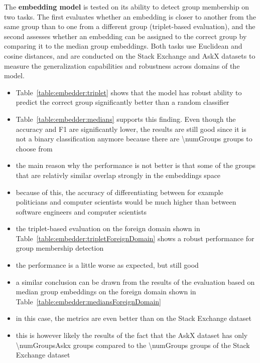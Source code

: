 The \textbf{embedding model} is tested on its ability to detect group membership on two tasks. The first evaluates whether an embedding is closer to another from the same group than to one from a different group (triplet-based evaluation), and the second assesses whether an embedding can be assigned to the correct group by comparing it to the median group embeddings. Both tasks use Euclidean and cosine distances, and are conducted on the Stack Exchange and AskX datasets to measure the generalization capabilities and robustness across domains of the model.

\begin{itemize}
  \item Table~\ref{table:embedder:triplet} shows that the model has robust ability to predict the correct group significantly better than a random classifier
  \item Table~\ref{table:embedder:medians} supports this finding. Even though the accuracy and F1 are significantly lower, the results are still good since it is not a binary classification anymore because there are \num{\numGroups} groups to choose from
  \item the main reason why the performance is not better is that some of the groups that are relativly similar overlap strongly in the embeddings space
  \item because of this, the accuracy of differentiating between for example politicians and computer scientists would be much higher than between software engineers and computer scientists

  \item the triplet-based evaluation on the foreign domain shown in Table~\ref{table:embedder:tripletForeignDomain} shows a robust performance for group membership detection
  \item the performance is a little worse as expected, but still good
  \item a similar conclusion can be drawn from the results of the evaluation based on median group embeddings on the foreign domain shown in Table~\ref{table:embedder:mediansForeignDomain}
  \item in this case, the metrics are even better than on the Stack Exchange dataset
  \item this is however likely the results of the fact that the AskX dataset has only \num{\numGroupsAskx} groups compared to the \num{\numGroups} groups of the Stack Exchange dataset
\end{itemize}

